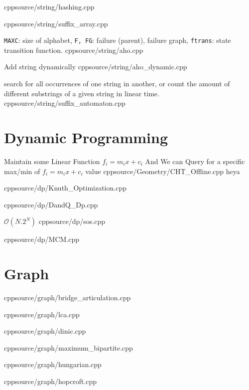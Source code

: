 \documentclass[landscape, 8pt, a4paper, oneside]{extarticle}
\begin{document}
\begin{multicols}{3}
{}
{}
{cpp}{source/string/hashing.cpp}

{}
{}
{cpp}{source/string/suffix_array.cpp}

{\texttt{MAXC}: size of alphabet, \texttt{F, FG}: failure (parent), failure graph, \texttt{ftrans}: state transition function.}
{}
{cpp}{source/string/aho.cpp}

{Add string dynamically}
{}
{cpp}{source/string/aho_dynamic.cpp}

{search for all occurrences of one string in another, or count the amount of different substrings of a given string in linear time.}
{}
{cpp}{source/string/suffix_automaton.cpp}

\section{Dynamic Programming}
{Maintain some Linear Function $ f_{i}=m_{i}x+c_{i} $ And We can Query for a specific max/min of $ f_{i}=m_{i}x+c_{i} $ value}
{}
{cpp}{source/Geometry/CHT_Offline.cpp}
{heya}

{}
{}
{cpp}{source/dp/Knuth_Optimization.cpp}

{}
{}
{cpp}{source/dp/DandQ_Dp.cpp}

{}
{$\mathcal{O}(N.2^N)$}
{cpp}{source/dp/sos.cpp}

{}
{}
{cpp}{source/dp/MCM.cpp}

\section {Graph}

{}
{}
{cpp}{source/graph/bridge_articulation.cpp}

{}
{}
{cpp}{source/graph/lca.cpp}


{}
{}
{cpp}{source/graph/dinic.cpp}

{}
{}
{cpp}{source/graph/maximum_bipartite.cpp}

{}
{}
{cpp}{source/graph/hungarian.cpp}

{}
{}
{cpp}{source/graph/hopcroft.cpp}


\end{multicols}
\end{document}
